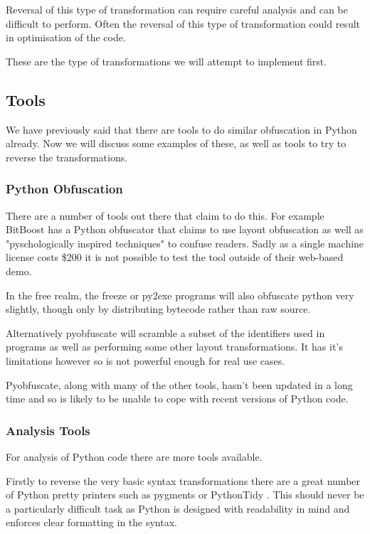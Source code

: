 \documentclass{report}
\begin{document}
Reversal of this type of transformation can require careful analysis and can be difficult to perform. Often the reversal
of this type of transformation could result in optimisation of the code.

These are the type of transformations we will attempt to implement first.

\subsection{Tools}

We have previously said that there are tools to do similar obfuscation in Python already. Now we will discuss some
examples of these, as well as tools to try to reverse the transformations.

\subsubsection{Python Obfuscation}

There are a number of tools out there that claim to do this. For example BitBoost has a Python obfuscator \cite{bitboost}
that claims to use layout obfuscation as well as "pyschologically inspired techniques" to confuse readers. Sadly as a
single machine license costs \$200 it is not possible to test the tool outside of their web-based demo.

In the free realm, the freeze \cite{freezereadme} or py2exe \cite{py2exe} programs will also obfuscate python very slightly,
though only by distributing bytecode rather than raw source.

Alternatively pyobfuscate \cite{pyobf} will scramble a subset of the identifiers used in programs as well as performing
some other layout transformations. It has it's limitations however \cite{pyobf} so is not powerful enough for real use cases.

Pyobfuscate, along with many of the other tools, hasn't been updated in a long time and so is likely to be unable to cope with
recent versions of Python code.

\subsubsection{Analysis Tools}

For analysis of Python code there are more tools available.

Firstly to reverse the very basic syntax transformations there are a great number of Python pretty printers such as
pygments \cite{pygments} or PythonTidy \cite{pythontidy}. This should never be a particularly difficult task as Python is
designed with readability in mind and enforces clear formatting in the syntax.
\end{document}
